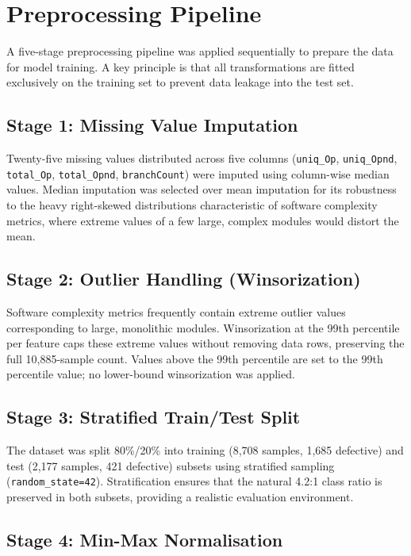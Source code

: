 \documentclass[12pt,a4paper,oneside]{report}
\begin{document}
\section{Preprocessing Pipeline}

A five-stage preprocessing pipeline was applied sequentially to prepare the data for model training. A key principle is that all transformations are fitted exclusively on the training set to prevent data leakage into the test set.

\subsection{Stage 1: Missing Value Imputation}

Twenty-five missing values distributed across five columns (\texttt{uniq\_Op}, \texttt{uniq\_Opnd}, \texttt{total\_Op}, \texttt{total\_Opnd}, \texttt{branchCount}) were imputed using column-wise median values. Median imputation was selected over mean imputation for its robustness to the heavy right-skewed distributions characteristic of software complexity metrics, where extreme values of a few large, complex modules would distort the mean.

\subsection{Stage 2: Outlier Handling (Winsorization)}

Software complexity metrics frequently contain extreme outlier values corresponding to large, monolithic modules. Winsorization at the 99th percentile per feature caps these extreme values without removing data rows, preserving the full 10,885-sample count. Values above the 99th percentile are set to the 99th percentile value; no lower-bound winsorization was applied.

\subsection{Stage 3: Stratified Train/Test Split}

The dataset was split 80\%/20\% into training (8,708 samples, 1,685 defective) and test (2,177 samples, 421 defective) subsets using stratified sampling (\texttt{random\_state=42}). Stratification ensures that the natural 4.2:1 class ratio is preserved in both subsets, providing a realistic evaluation environment.

\subsection{Stage 4: Min-Max Normalisation}
\end{document}
